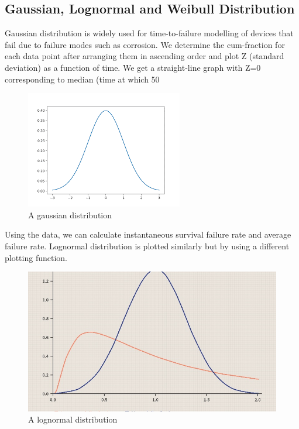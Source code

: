 \pagebreak
\subsection{Gaussian, Lognormal and Weibull Distribution}
Gaussian distribution is widely used for time-to-failure modelling of devices that fail due to failure modes such as corrosion. We determine the cum-fraction for each data point after arranging them in ascending order and plot Z (standard deviation) as a function of time. We get a straight-line graph with Z=0 corresponding to median (time at which 50%

\begin{figure}[htb]
\centering
\includegraphics[scale=0.6]{./fig27} %
\caption{A gaussian distribution}
\label{3.27} %
\end{figure}

\noindent Using the data, we can calculate instantaneous survival failure rate and average failure rate. Lognormal distribution is plotted similarly but by using a different plotting function.

\begin{figure}[htb]
\centering
\includegraphics[scale=0.6]{./fig28} %
\caption{A lognormal distribution}
\label{3.28} %
\end{figure}

